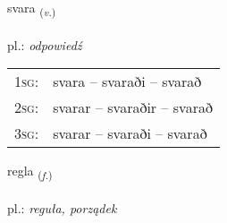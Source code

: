 \documentclass[frontgrid, backgrid]{flacards}\usepackage[]{graphicx}\usepackage[]{xcolor}
\begin{document}
\renewcommand{\blhead}{\vskip5pt {\small\bfseries\footnotesize Sagnorð | czasownik }}
\renewcommand{\bcfoot}{\vskip5pt \hspace{2pt}{\small\bfseries\footnotesize 1K}}


{svara \small{\textsubscript{(\textit{v.})}} \\[1ex] %
\textphonetic{[svaːra]} \\
pl.: \emph{odpowiedź} \\  [2ex]
\renewcommand*{\arraystretch}{0.8}
\begin{tabular}{p{1cm}l}
\textsc{1sg}: & svara -- svaraði -- svarað \\ 
\textsc{2sg}: & svarar -- svaraðir -- svarað \\ 
\textsc{3sg}: & svarar -- svaraði -- svarað \\ 
\end{tabular}
}

\renewcommand{\flhead}{\vskip5pt \fboxsep=0pt {\small\bfseries\footnotesize Nafnorð | rzeczownik}}
\renewcommand{\fcfoot}{\vskip5pt \fboxsep=0pt \hspace{2pt}{\small\bfseries\footnotesize 1K}}

\renewcommand{\blhead}{\vskip5pt {\small\bfseries\footnotesize Nafnorð | rzeczownik }}
\renewcommand{\bcfoot}{\vskip5pt \hspace{2pt}{\small\bfseries\footnotesize 1K}}


{regla \small{\textsubscript{(\textit{f.})}} \\[1ex] %
\textphonetic{[rɛkla]} \\
pl.: \emph{reguła, porządek} \\  [2ex]
\renewcommand*{\arraystretch}{0.8}
}

\end{document}
